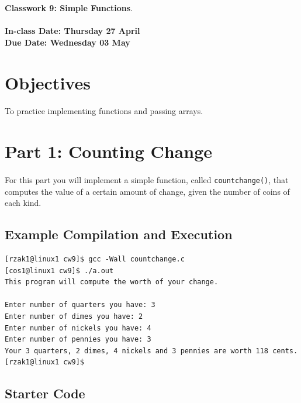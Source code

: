 \documentclass[letter,11pt]{article}
\begin{document}
\huge
\textbf{Classwork 9: Simple Functions}.
\normalsize
\\ ~~ \\
\textbf{In-class Date: Thursday 27 April} \\
\textbf{Due Date: Wednesday 03 May}

\section*{Objectives}
\paragraph{}To practice implementing functions and passing arrays.

\section*{Part 1: Counting Change}
\paragraph{}For this part you will implement a simple function, called \texttt{countchange()}, that computes the value of a certain amount of change, given the number of coins of each kind.

\subsection*{Example Compilation and Execution}
\begin{verbatim}
[rzak1@linux1 cw9]$ gcc -Wall countchange.c
[cos1@linux1 cw9]$ ./a.out
This program will compute the worth of your change.

Enter number of quarters you have: 3
Enter number of dimes you have: 2
Enter number of nickels you have: 4
Enter number of pennies you have: 3
Your 3 quarters, 2 dimes, 4 nickels and 3 pennies are worth 118 cents.
[rzak1@linux1 cw9]$ 
\end{verbatim}

\subsection*{Starter Code}
\end{document}
